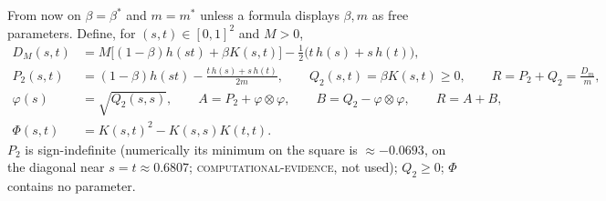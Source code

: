 \documentclass[11pt]{article}
\theoremstyle{plain}
\theoremstyle{definition}
\theoremstyle{remark}
\newcommand{\lbl}[1]{\textsc{#1}}
\begin{document}
From now on $\beta=\beta^\ast$ and $m=m^\ast$ unless a formula displays
$\beta,m$ as free parameters.  Define, for $(s,t)\in[0,1]^2$ and $M>0$,
\begin{align}
D_M(s,t)&=M\bigl[(1-\beta)h(st)+\beta K(s,t)\bigr]-\tfrac12\bigl(t\,h(s)+s\,h(t)\bigr),\label{eq:DM}\\
P_2(s,t)&=(1-\beta)h(st)-\frac{t\,h(s)+s\,h(t)}{2m},\qquad
Q_2(s,t)=\beta K(s,t)\ge0,\qquad R=P_2+Q_2=\frac{D_m}{m},\label{eq:R}\\
\varphi(s)&=\sqrt{Q_2(s,s)},\qquad A=P_2+\varphi\otimes\varphi,\qquad
B=Q_2-\varphi\otimes\varphi,\qquad R=A+B,\label{eq:AB}\\
\Phi(s,t)&=K(s,t)^2-K(s,s)K(t,t).\label{eq:Phi}
\end{align}
$P_2$ is sign-indefinite (numerically its minimum on the square is
$\approx-0.0693$, on the diagonal near $s=t\approx0.6807$;
\lbl{computational-evidence}, not used); $Q_2\ge0$; $\Phi$ contains no
parameter.
\end{document}

